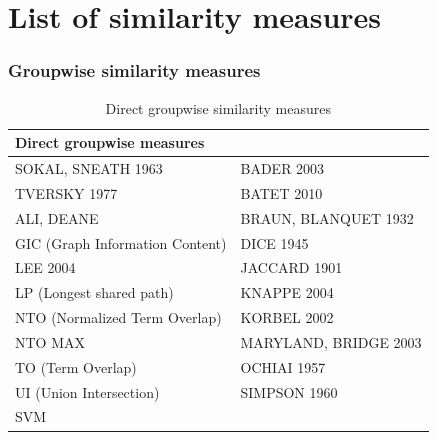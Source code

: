 \documentclass{beamer}
\begin{document}
\section{List of similarity measures}

\begin{frame}
\frametitle{Groupwise similarity measures}
\begin{table}
\begin{tabular}{l l}
\toprule
\textbf{Direct groupwise measures} \\
\midrule
SOKAL, SNEATH 1963 & BADER 2003 \\
TVERSKY 1977 & BATET 2010 \\
ALI, DEANE & BRAUN, BLANQUET 1932 \\
GIC (Graph Information Content) & DICE 1945 \\
LEE 2004 & JACCARD 1901 \\
LP (Longest shared path) & KNAPPE 2004 \\
NTO (Normalized Term Overlap) & KORBEL 2002 \\
NTO MAX & MARYLAND, BRIDGE 2003 \\
TO (Term Overlap) & OCHIAI 1957 \\
UI (Union Intersection) & SIMPSON 1960 \\
SVM &  \\

\bottomrule
\end{tabular}
\caption{Direct groupwise similarity measures}
\end{table}
\end{frame}

\end{document}
